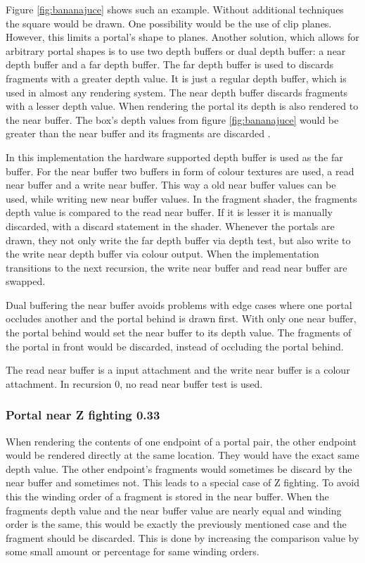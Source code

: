 Figure \ref{fig:bananajuce} shows such an example. Without additional techniques the square would be drawn. One possibility would be the use of clip planes. However, this limits a portal's shape to planes. Another solution, which allows for arbitrary portal shapes is to use two depth buffers or dual depth buffer: a near depth buffer and a far depth buffer. The far depth buffer is used to discards fragments with a greater depth value. It is just a regular depth buffer, which is used in almost any rendering system. The near depth buffer discards fragments with a lesser depth value. When rendering the portal its depth is also rendered to the near buffer. The box's depth values from figure \ref{fig:bananajuce} would be greater than the near buffer and its fragments are discarded \cite{lowe:2005:technique, ropinski:2004:real}.

In this implementation the hardware supported depth buffer is used as the far buffer. For the near buffer two buffers in form of colour textures are used, a read near buffer and a write near buffer. This way a old near buffer values can be used, while writing new near buffer values. In the fragment shader, the fragments depth value is compared to the read near buffer. If it is lesser it is manually discarded, with a discard statement in the shader. Whenever the portals are drawn, they not only write the far depth buffer via depth test, but also write to the write near depth buffer via colour output. When the implementation transitions to the next recursion, the write near buffer and read near buffer are swapped.

Dual buffering the near buffer avoids problems with edge cases where one portal occludes another and the portal behind is drawn first. With only one near buffer, the portal behind would set the near buffer to its depth value. The fragments of the portal in front would be discarded, instead of occluding the portal behind.

The read near buffer is a input attachment and the write near buffer is a colour attachment. In recursion 0, no read near buffer test is used.

\subsubsection{Portal near Z fighting 0.33}
\label{section:portalzfighting}
When rendering the contents of one endpoint of a portal pair, the other endpoint would be rendered directly at the same location. They would have the exact same depth value. The other endpoint's fragments would sometimes be discard by the near buffer and sometimes not. This leads to a special case of Z fighting. To avoid this the winding order of a fragment is stored in the near buffer. When the fragments depth value and the near buffer value are nearly equal and winding order is the same, this would be exactly the previously mentioned case and the fragment should be discarded. This is done by increasing the comparison value by some small amount or percentage for same winding orders.

